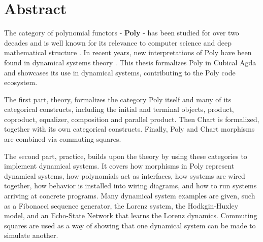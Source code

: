 
\thispagestyle{plain}			%
\section*{Abstract}

The category of polynomial functors - \textbf{Poly} - has been studied for over two decades and is well known for its relevance to computer science \cite{containersPaper} and deep mathematical structure \cite{polynomialFunctorsCategory}.
In recent years, new interpretations of Poly have been found in dynamical systems theory \cite{poly-book}. 
This thesis formalizes Poly in Cubical Agda and showcases its use in dynamical systems, contributing to the Poly code ecosystem.

The first part, theory, formalizes the category Poly itself and many of its categorical constructs, including the initial and terminal objects, product, coproduct, equalizer, composition and parallel product. %
Then Chart is formalized, together with its own categorical constructs.
Finally, Poly and Chart morphisms are combined via commuting squares.   %

The second part, practice, builds upon the theory by using these categories to implement dynamical systems.
It covers how morphisms in Poly represent dynamical systems, how polynomials act as interfaces, how
systems are wired together, how behavior is installed into wiring diagrams, and how to run systems arriving at concrete programs.
Many dynamical system examples are given, such as a Fibonacci sequence generator, the Lorenz system, the Hodkgin-Huxley model, and an Echo-State Network that learns the Lorenz dynamics. %
Commuting squares are used as a way of showing that one dynamical system can be made to simulate another.




